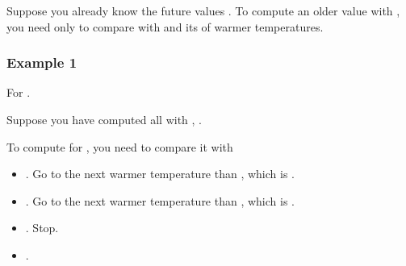\documentclass[letterpaper,12pt,english]{book}
\begin{document}
\sphinxAtStartPar
Suppose you already know the future values . To compute an older value  with , you need only to compare  with  and its  of warmer temperatures.


\subsubsection{Example 1}
\label{\detokenize{Array/01_ARR_739_Daily_Temperatures:id2}}
\sphinxAtStartPar
For .

\sphinxAtStartPar
Suppose you have computed all  with , .

\sphinxAtStartPar
To compute  for , you need to compare it with
\begin{itemize}
\item {} 
\sphinxAtStartPar
{}. Go to the next warmer temperature than , which is .

\item {} 
\sphinxAtStartPar
{}. Go to the next warmer temperature than , which is .

\item {} 
\sphinxAtStartPar
{}. Stop.

\item {} 
\sphinxAtStartPar
{}.

\end{itemize}
\end{document}

